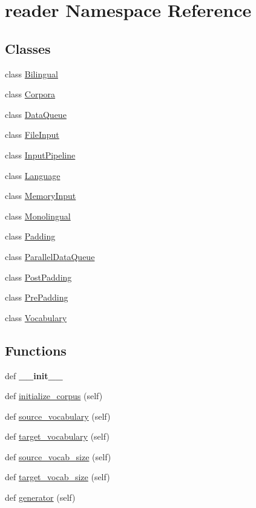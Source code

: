 \hypertarget{namespacereader}{}\section{reader Namespace Reference}
\label{namespacereader}
\subsection*{Classes}
\begin{DoxyCompactItemize}
\item 
class \hyperlink{classreader_1_1Bilingual}{Bilingual}
\item 
class \hyperlink{classreader_1_1Corpora}{Corpora}
\item 
class \hyperlink{classreader_1_1DataQueue}{Data\+Queue}
\item 
class \hyperlink{classreader_1_1FileInput}{File\+Input}
\item 
class \hyperlink{classreader_1_1InputPipeline}{Input\+Pipeline}
\item 
class \hyperlink{classreader_1_1Language}{Language}
\item 
class \hyperlink{classreader_1_1MemoryInput}{Memory\+Input}
\item 
class \hyperlink{classreader_1_1Monolingual}{Monolingual}
\item 
class \hyperlink{classreader_1_1Padding}{Padding}
\item 
class \hyperlink{classreader_1_1ParallelDataQueue}{Parallel\+Data\+Queue}
\item 
class \hyperlink{classreader_1_1PostPadding}{Post\+Padding}
\item 
class \hyperlink{classreader_1_1PrePadding}{Pre\+Padding}
\item 
class \hyperlink{classreader_1_1Vocabulary}{Vocabulary}
\end{DoxyCompactItemize}
\subsection*{Functions}
\begin{DoxyCompactItemize}
\item 
def {\bfseries \+\_\+\+\_\+init\+\_\+\+\_\+}\hypertarget{namespacereader_a24cd9e6d360f39f1e93d2ffe5a6a3d94}{}\label{namespacereader_a24cd9e6d360f39f1e93d2ffe5a6a3d94}

\item 
def \hyperlink{namespacereader_a252ff9835d10a3f4286036fd3d644575}{initialize\+\_\+corpus} (self)
\item 
def \hyperlink{namespacereader_aeba8470d82605c8e8d6d70ace35a4e72}{source\+\_\+vocabulary} (self)
\item 
def \hyperlink{namespacereader_a8cdfdd07f53f15ea3472528cc1860093}{target\+\_\+vocabulary} (self)
\item 
def \hyperlink{namespacereader_ab428a30ed4624cee95a4b41e8d462fb7}{source\+\_\+vocab\+\_\+size} (self)
\item 
def \hyperlink{namespacereader_accdcc0ae0f482d31890579d9dc15cd24}{target\+\_\+vocab\+\_\+size} (self)
\item 
def \hyperlink{namespacereader_a78392f924ab3df83b6a32130fe1a6d6b}{generator} (self)
\end{DoxyCompactItemize}
